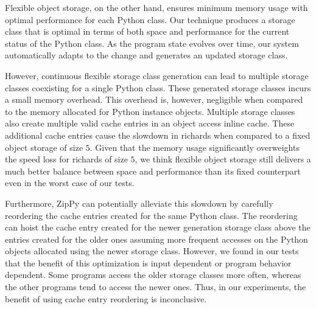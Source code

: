 Flexible object storage, on the other hand, ensures minimum memory usage with optimal performance for each Python class.
Our technique produces a storage class that is optimal in terms of both space and performance for the current status of the Python class.
As the program state evolves over time, our system automatically adapts to the change and generates an updated storage class.

However, continuous flexible storage class generation can lead to multiple storage classes coexisting for a single Python class.
These generated storage classes incurs a small memory overhead.
This overhead is, however, negligible when compared to the memory allocated for Python instance objects.
Multiple storage classes also create multiple valid cache entries in an object access inline cache.
These additional cache entries cause the slowdown in \textsf{richards} when compared to a fixed object storage of size $5$.
Given that the memory usage significantly overweights the speed loss for \textsf{richards} of size $5$, we think flexible object storage still delivers a much better balance between space and performance than its fixed counterpart even in the worst case of our tests.

Furthermore, ZipPy can potentially alleviate this slowdown by carefully reordering the cache entries created for the same Python class.
The reordering can hoist the cache entry created for the newer generation storage class above the entries created for the older ones assuming more frequent accesses on the Python objects allocated using the newer storage class.
However, we found in our tests that the benefit of this optimization is input dependent or program behavior dependent.
Some programs access the older storage classes more often, whereas the other programs tend to access the newer ones.
Thus, in our experiments, the benefit of using cache entry reordering is inconclusive.
